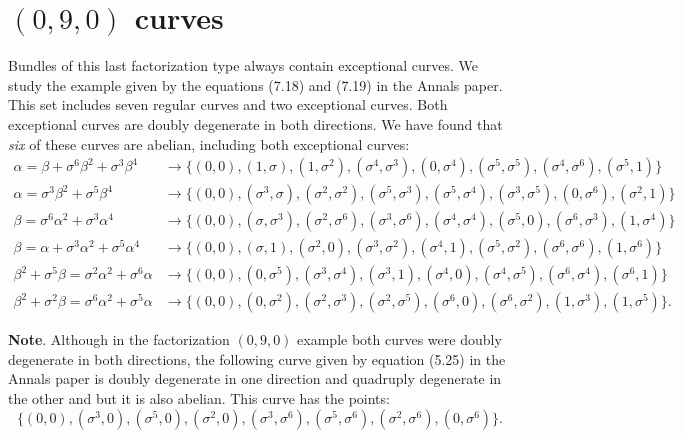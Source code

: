 \documentclass[a4paper]{article}
\begin{document}
  \section{$(0,9,0)$ curves}

  Bundles of this last factorization type always contain
  exceptional curves. We study the example given by the
  equations (7.18) and (7.19) in the Annals paper. This set
  includes seven regular curves and two exceptional curves.
  Both exceptional curves are doubly degenerate in both
  directions. We have found that \textit{six} of these
  curves are abelian, including both exceptional curves:
  \begin{align}
    \alpha = \beta + \sigma^{6} \beta^2 + \sigma^3 \beta^{4}
    &\to \{
      (0,0), (1, \sigma), (1,\sigma^2),
      (\sigma^{4},\sigma^3), (0,\sigma^{4}),
      (\sigma^{5},\sigma^{5}), (\sigma^{4},\sigma^{6}), 
      (\sigma^{5},1)
    \} \\
    \alpha = \sigma^3 \beta^2 + \sigma^{5} \beta^{4}
    &\to \{
      (0,0), (\sigma^3,\sigma), (\sigma^2,\sigma^2),
      (\sigma^{5},\sigma^3), (\sigma^{5},\sigma^{4}),
      (\sigma^3,\sigma^{5}), (0,\sigma^{6}), (\sigma^2,1)
    \} \\
    \beta = \sigma^6 \alpha^2 + \sigma^3 \alpha^{4}
    &\to \{
      (0,0), (\sigma,\sigma^3), (\sigma^2,\sigma^{6}),
      (\sigma^3,\sigma^{6}), (\sigma^{4},\sigma^{4}),
      (\sigma^{5},0), (\sigma^{6},\sigma^3), (1,\sigma^{4})
    \} \\
    \beta = \alpha + \sigma^3 \alpha^2 + \sigma^{5}
    \alpha^{4} 
    &\to \{
      (0,0), (\sigma,1), (\sigma^2,0), (\sigma^3,\sigma^2),
      (\sigma^{4},1), (\sigma^{5},\sigma^2),
      (\sigma^{6},\sigma^{6}), (1,\sigma^{6})
    \} \\
    \beta^2 + \sigma^{5} \beta = \sigma^2\alpha^2 +
    \sigma^{6}\alpha
    &\to \{
      (0,0), (0,\sigma^{5}), (\sigma^3,\sigma^{4}),
      (\sigma^3,1), (\sigma^{4},0), (\sigma^{4},\sigma^{5}),
      (\sigma^{6},\sigma^{4}), (\sigma^{6},1)
    \} \\
    \beta^2 + \sigma^2 \beta = \sigma^{6} \alpha^2 +
    \sigma^{5} \alpha
    &\to \{
      (0,0), (0,\sigma^2), (\sigma^2,\sigma^3),
      (\sigma^2,\sigma^{5}), (\sigma^{6},0),
      (\sigma^{6},\sigma^2), (1,\sigma^{3}), (1, \sigma^{5})
    \}.
  \end{align}

  \textbf{Note}. Although in the factorization $(0,9,0)$
  example both curves were doubly degenerate in both
  directions, the following curve given by equation (5.25)
  in the Annals paper is doubly degenerate in one direction
  and quadruply degenerate in the other and but it is also
  abelian. This curve has the points:
  \begin{equation}
    \{
      (0,0), (\sigma^3,0), (\sigma^{5},0), (\sigma^2,0),
      (\sigma^3,\sigma^6), (\sigma^5,\sigma^6), 
      (\sigma^2, \sigma^6), (0,\sigma^6)
    \}.
  \end{equation}
\end{document}
